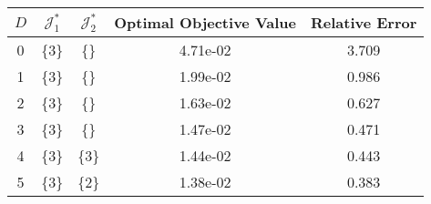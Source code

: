 \begin{subtable}{\textwidth}
\centering
\begin{tabular}{|c|c|c|c|c|}
  \hline
$D$ & $\mathcal J_1^*$ & $\mathcal J_2^*$ & Optimal Objective Value & Relative Error \\ 
  \hline
0 & \{3\} & \{\} & 4.71e-02 & 3.709 \\ 
  1 & \{3\} & \{\} & 1.99e-02 & 0.986 \\ 
  2 & \{3\} & \{\} & 1.63e-02 & 0.627 \\ 
  3 & \{3\} & \{\} & 1.47e-02 & 0.471 \\ 
  4 & \{3\} & \{3\} & 1.44e-02 & 0.443 \\ 
  5 & \{3\} & \{2\} & 1.38e-02 & 0.383 \\ 
   \hline
\end{tabular}
\end{subtable}
